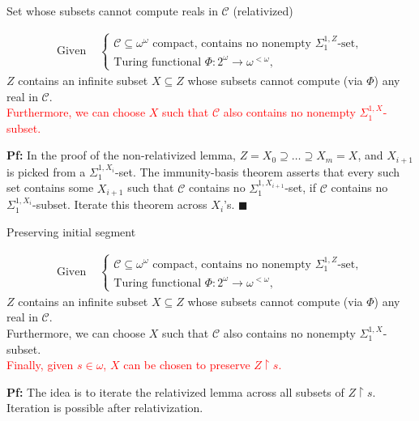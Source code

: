\begin{frame}{Set whose subsets cannot compute reals in $\mathcal{C}$
(relativized)}
  \begin{main-lemma*}[\textcolor{red}{Relativized}]
    \begin{align*}
      \text{Given } &\begin{cases}
        \mathcal{C}\subseteq\omega^\omega \text{ compact, contains
        no nonempty } \Sigma^{1,Z}_1\text{-set},\\
        \text{Turing functional } \Phi:2^{\omega}\rightarrow
        \omega^{<\omega},
      \end{cases}
    \end{align*}
    $Z$ contains an infinite subset $X\subseteq Z$ whose subsets cannot
    compute (via $\Phi$) any real in $\mathcal{C}$.\\
    \vspace{0.5em}
    \pause
    \textcolor{red}{Furthermore, we can choose $X$ such that $\mathcal{C}$
    also contains no nonempty $\Sigma_1^{1,X}$-subset.}
  \end{main-lemma*}

  \pause
  \textbf{Pf:} In the proof of the non-relativized lemma, $Z=X_0
  \supseteq \ldots\supseteq X_m=X$, and $X_{i+1}$ is picked from a
  $\Sigma^{1,X_i}_1$-set. The immunity-basis theorem asserts
  that every such set contains some $X_{i+1}$ such that $\mathcal{C}$
  contains no $\Sigma_1^{1,X_{i+1}}$-set, if $\mathcal{C}$ contains no
  $\Sigma^{1,X_i}_1$-subset. Iterate this theorem across $X_i$'s.
  $\blacksquare$
\end{frame}

\begin{frame}{Preserving initial segment}
  \begin{main-lemma*}
    \begin{align*}
      \text{Given } &\begin{cases}
        \mathcal{C}\subseteq\omega^\omega \text{ compact, contains
        no nonempty } \Sigma^{1,Z}_1\text{-set},\\
        \text{Turing functional } \Phi:2^{\omega}\rightarrow
        \omega^{<\omega},
      \end{cases}
    \end{align*}
    $Z$ contains an infinite subset $X\subseteq Z$ whose subsets cannot
    compute (via $\Phi$) any real in $\mathcal{C}$.\\
    \vspace{0.5em}
    Furthermore, we can choose $X$ such that $\mathcal{C}$ also contains no
    nonempty $\Sigma_1^{1,X}$-subset.\\
    \vspace{0.5em}
    \pause
    \textcolor{red}{Finally, given $s\in\omega$, $X$ can be chosen to
    preserve $Z\restriction s$.}
  \end{main-lemma*}

  \pause
  \vspace{1em}
  \textbf{Pf:} The idea is to iterate the relativized lemma across all
  subsets of $Z\restriction s$. Iteration is possible after relativization.
\end{frame}

